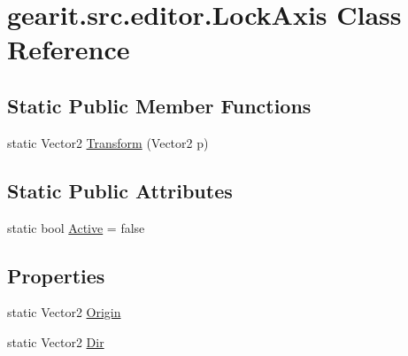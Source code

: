 \hypertarget{classgearit_1_1src_1_1editor_1_1_lock_axis}{\section{gearit.\+src.\+editor.\+Lock\+Axis Class Reference}
\label{classgearit_1_1src_1_1editor_1_1_lock_axis}
}
\subsection*{Static Public Member Functions}
\begin{DoxyCompactItemize}
\item 
static Vector2 \hyperlink{classgearit_1_1src_1_1editor_1_1_lock_axis_a5cde267105da2f5d97acc82586584757}{Transform} (Vector2 p)
\end{DoxyCompactItemize}
\subsection*{Static Public Attributes}
\begin{DoxyCompactItemize}
\item 
static bool \hyperlink{classgearit_1_1src_1_1editor_1_1_lock_axis_a4536f92f2b7ba7ca7652392da1e3afc4}{Active} = false
\end{DoxyCompactItemize}
\subsection*{Properties}
\begin{DoxyCompactItemize}
\item 
static Vector2 \hyperlink{classgearit_1_1src_1_1editor_1_1_lock_axis_a02c68e1cea8095e45e7d99dfeeed5e3f}{Origin}
\item 
static Vector2 \hyperlink{classgearit_1_1src_1_1editor_1_1_lock_axis_a5e8a95cd52bffdf165600f53294194a9}{Dir}
\end{DoxyCompactItemize}


